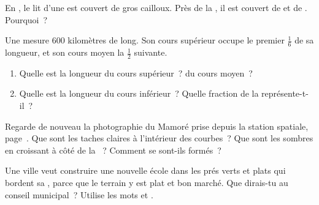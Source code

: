 \begin{exercise}[$\star$]\label{exo:g5:water-shapes-the-land:6}
En , le lit d'une  est couvert de gros cailloux. Près de la
, il est couvert de  et de . Pourquoi~?
\end{exercise}

\begin{exercise}[$\star\star$]\label{exo:g5:water-shapes-the-land:7}
Une  mesure 600 kilomètres de long. Son cours supérieur occupe le
premier $\frac{1}{6}$ de sa longueur, et son cours moyen la
$\frac{1}{2}$ suivante.
\begin{enumerate}
  \item[(a)] Quelle est la longueur du cours supérieur~? du cours moyen~?
  \item[(b)] Quelle est la longueur du cours inférieur~? Quelle fraction de
        la  représente-t-il~?
\end{enumerate}
\end{exercise}

\begin{exercise}[$\star\star$]\label{exo:g5:water-shapes-the-land:8}
Regarde de nouveau la photographie du Mamoré prise depuis la station
spatiale, page~\pageref{fig:g5:water-shapes-the-land:mamore}. Que sont les
taches claires à l'intérieur des courbes~? Que sont les  sombres en
croissant à côté de la ~? Comment se sont-ils formés~?
\end{exercise}

\begin{exercise}[$\star\star$]\label{exo:g5:water-shapes-the-land:9}
Une ville veut construire une nouvelle école dans les prés verts et plats
qui bordent sa , parce que le terrain y est plat et bon marché. Que
dirais-tu au conseil municipal~? Utilise les mots \emph{} et
\emph{}.
\end{exercise}

